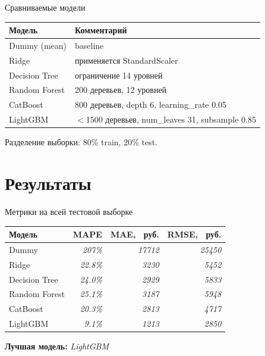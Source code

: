 \documentclass[aspectratio=169,12pt]{beamer}
\newcommand{\rub}{~руб.}
\begin{document}
\begin{frame}{Сравниваемые модели}
  \begin{table}
    \centering
    \small
    \begin{tabular}{@{}ll@{}}
      \toprule
      \textbf{Модель} & \textbf{Комментарий} \\
      \midrule
      Dummy (mean) & baseline \\
      Ridge & применяется StandardScaler \\
      Decision Tree & ограничение 14 уровней \\
      Random Forest & 200 деревьев, 12 уровней \\
      CatBoost & 800 деревьев, depth 6, learning\_rate 0.05 \\
      LightGBM & $<$1500 деревьев, num\_leaves 31, subsample 0.85 \\
      \bottomrule
    \end{tabular}
  \end{table}

  \vspace{0.5em}
  Разделение выборки: 80\% train, 20\% test. \\
\end{frame}

\section{Результаты}

\begin{frame}{Метрики на всей тестовой выборке}
  \begin{table}
    \centering
    \begin{tabular}{@{}lrrr@{}}
      \toprule
      \textbf{Модель} & \textbf{MAPE} & \textbf{MAE, \rub} & \textbf{RMSE, \rub} \\
      \midrule
      Dummy & \textit{207\%} & \textit{17712} & \textit{25450} \\
      Ridge & \textit{22.8\%} & \textit{3230} & \textit{5452} \\
      Decision Tree & \textit{24.0\%} & \textit{2929} & \textit{5833} \\
      Random Forest & \textit{25.1\%} & \textit{3187} & \textit{5948} \\
      CatBoost & \textit{20.3\%} & \textit{2813} & \textit{4717} \\
      LightGBM & \textit{9.1\%} & \textit{1213} & \textit{2850} \\
      \bottomrule
    \end{tabular}
  \end{table}

  \vspace{0.5em}
  \textbf{Лучшая модель:} \textit{LightGBM} \\
\end{frame}
\end{document}
